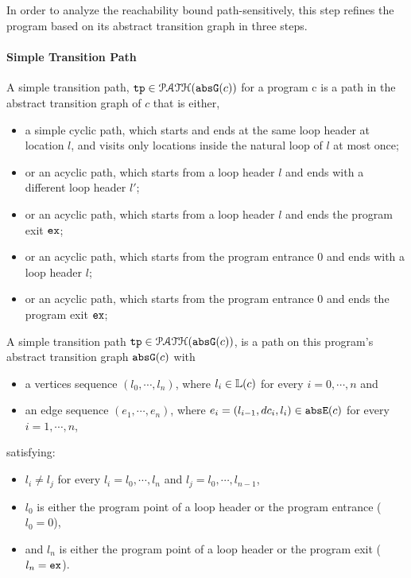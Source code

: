 \subsection{}
\label{sec:pathsensitive_rb-refine}
In order to analyze the reachability bound path-sensitively, this step refines the program based on its abstract transition graph in three steps.
%
\paragraph{Simple Transition Path}
%
A simple transition path, $\mathtt{tp} \in \mathcal{PATH}(\mathtt{abs}{\mathtt{G}}(c))$ for a program c is
a path in the abstract transition graph of $c$ that is either,
\begin{itemize}
  \item a simple cyclic path, which starts and ends at the same loop header at location $l$, 
  and visits only locations inside the natural loop of $l$ at most once;
  \item or an acyclic path, which starts from a loop header $l$ 
and ends with a different loop header $l'$;
\item or an acyclic path, which starts from a loop header $l$ 
and ends the program exit $\mathtt{ex}$;
\item or an acyclic path, which starts from the program entrance $0$
and ends with a loop header $l$;
\item or an acyclic path, which starts from the program entrance $0$
and ends the program exit $\mathtt{ex}$;
\end{itemize}
  \begin{defn}
  A simple transition path
  $\mathtt{tp} \in \mathcal{PATH}(\mathtt{abs}{\mathtt{G}}(c))$, is a path on this program's abstract transition graph $\mathtt{abs}{\mathtt{G}}(c)$ with 
  \begin{itemize}
  \item a vertices sequence $(l_0, \cdots, l_n)$, where $l_i \in \mathbb{L}(c)$ for every $i = 0, \cdots, n$ and
  \item an edge sequence $(e_1, \cdots, e_n)$, where $e_i = (l_{i - 1}, dc_i, l_{i}) \in \mathtt{abs}{\mathtt{E}}(c)$ for every $i = 1, \cdots, n$,
  \end{itemize}
  satisfying:
  \begin{itemize}
    \item $l_i \neq l_j$ for every $l_i = l_0, \cdots, l_n$ and $l_j = l_0, \cdots, l_{n - 1}$,
    \item $l_0$ is either the program point of a loop header or the program entrance ($l_0 = 0$),
    \item and $l_n$ is either the program point of a loop header or the program exit ($l_n = \mathtt{ex}$).
  \end{itemize}
  \end{defn}

